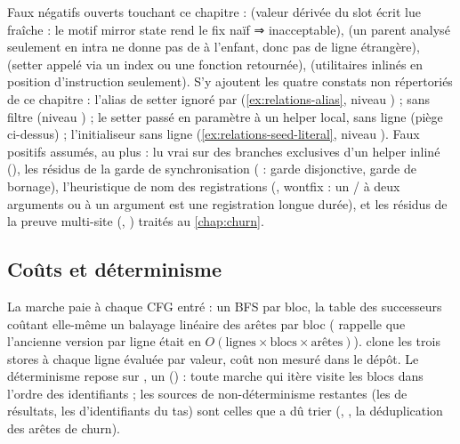 Faux négatifs ouverts touchant ce chapitre :  (valeur dérivée du slot écrit lue  fraîche : le motif \og mirror state\fg{} rend le fix naïf  ⇒  inacceptable),  (un parent analysé seulement en intra ne donne pas de  à l'enfant, donc pas de ligne étrangère),  (setter appelé via un index ou une fonction retournée),  (utilitaires inlinés en position d'instruction seulement). S'y ajoutent les quatre constats non répertoriés de ce chapitre : l'alias de setter ignoré par  (\cref{ex:relations-alias}, niveau \Error) ;  sans filtre  (niveau \Warning) ; le setter passé en paramètre à un helper local, sans ligne (piège ci-dessus) ; l'initialiseur  sans ligne  (\cref{ex:relations-seed-literal}, niveau \Warning). Faux positifs assumés, au plus \Warning{} :  lu vrai sur des branches exclusives d'un helper inliné (), les résidus de la garde de synchronisation ( : garde disjonctive, garde de bornage), l'heuristique de nom des registrations (, wontfix : un / à deux arguments ou  à un argument est une registration longue durée), et les résidus de la preuve multi-site (, ) traités au \cref{chap:churn}.

\subsection{Coûts et déterminisme}

La marche paie  à chaque CFG entré : un BFS par bloc, la table des successeurs coûtant elle-même un balayage linéaire des arêtes par bloc ( rappelle que l'ancienne version par ligne était en $O(\text{lignes} \times \text{blocs} \times \text{arêtes})$).  clone les trois stores à chaque ligne évaluée par valeur, coût non mesuré dans le dépôt. Le déterminisme repose sur , un  () : toute marche qui itère  visite les blocs dans l'ordre des identifiants ; les sources de non-déterminisme restantes (les  de résultats, les  d'identifiants du tas) sont celles que  a dû trier (, , la déduplication des arêtes de churn).

